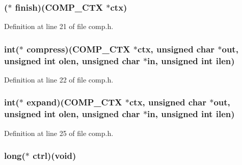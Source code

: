 \subsubsection[{\texorpdfstring{finish}{finish}}]{($\ast$ finish)({\bf C\+O\+M\+P\+\_\+\+C\+TX} $\ast$ctx)}\hypertarget{structcomp__method__st_a4fc226988af06a1772bbf7c12b10141e}{}\label{structcomp__method__st_a4fc226988af06a1772bbf7c12b10141e}


Definition at line 21 of file comp.\+h.

\subsubsection[{\texorpdfstring{compress}{compress}}]{\setlength{\rightskip}{0pt plus 5cm}int($\ast$ compress)({\bf C\+O\+M\+P\+\_\+\+C\+TX} $\ast$ctx, unsigned char $\ast$out, unsigned int olen, unsigned char $\ast$in, unsigned int ilen)}\hypertarget{structcomp__method__st_aaeadea1a73e2fca0aeae93a7dd191949}{}\label{structcomp__method__st_aaeadea1a73e2fca0aeae93a7dd191949}


Definition at line 22 of file comp.\+h.

\subsubsection[{\texorpdfstring{expand}{expand}}]{\setlength{\rightskip}{0pt plus 5cm}int($\ast$ expand)({\bf C\+O\+M\+P\+\_\+\+C\+TX} $\ast$ctx, unsigned char $\ast$out, unsigned int olen, unsigned char $\ast$in, unsigned int ilen)}\hypertarget{structcomp__method__st_aa83ce140c86f498786966f2badf20454}{}\label{structcomp__method__st_aa83ce140c86f498786966f2badf20454}


Definition at line 25 of file comp.\+h.

\subsubsection[{\texorpdfstring{ctrl}{ctrl}}]{\setlength{\rightskip}{0pt plus 5cm}long($\ast$ ctrl)({\bf void})}\hypertarget{structcomp__method__st_ae81415e772da7d3a5af55e704bb99ca6}{}\label{structcomp__method__st_ae81415e772da7d3a5af55e704bb99ca6}


